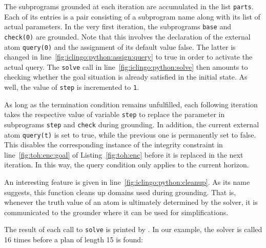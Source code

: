 The subprograms grounded at each iteration are accumulated in the list \lstinline{parts}.
Each of its entries is a pair consisting of a subprogram name along with its list of actual parameters.
In the very first iteration, the subprograms \lstinline{base} and \lstinline{check(0)} are grounded.
Note that this involves the declaration of the external atom \lstinline{query(0)} and the assignment of its default value false.
The latter is changed in line~\ref{fig:iclingo:python:assign:query} to true in order to activate the actual query.
The \lstinline{solve} call in line~\ref{fig:iclingo:python:solve} then amounts to checking whether the goal situation is already satisfied in the initial state.
As well, the value of \lstinline{step} is incremented to \lstinline{1}.

As long as the termination condition remains unfulfilled,
each following iteration takes the respective value of variable \lstinline{step}
to replace the parameter in subprograms \lstinline{step} and \lstinline{check}
during grounding.
In addition,
the current external atom \lstinline{query(t)} is set to true,
while the previous one is permanently set to false.
This disables the corresponding instance of the integrity constraint in line~\ref{fig:toh:enc:goal} of Listing~\ref{fig:toh:enc} before it is replaced in the next iteration.
In this way,
the query condition only applies to the current horizon.

An interesting feature is given in line~\ref{fig:iclingo:python:cleanup}.
As its name suggests, this function cleans up domains used during grounding.
That is, whenever the truth value of an atom is ultimately determined by the solver,
it is communicated to the grounder where it can be used for simplifications.

The result of each call to \lstinline{solve} is printed by \clingo.
In our example, the solver is called 16 times before a plan of length 15 is found:
%


